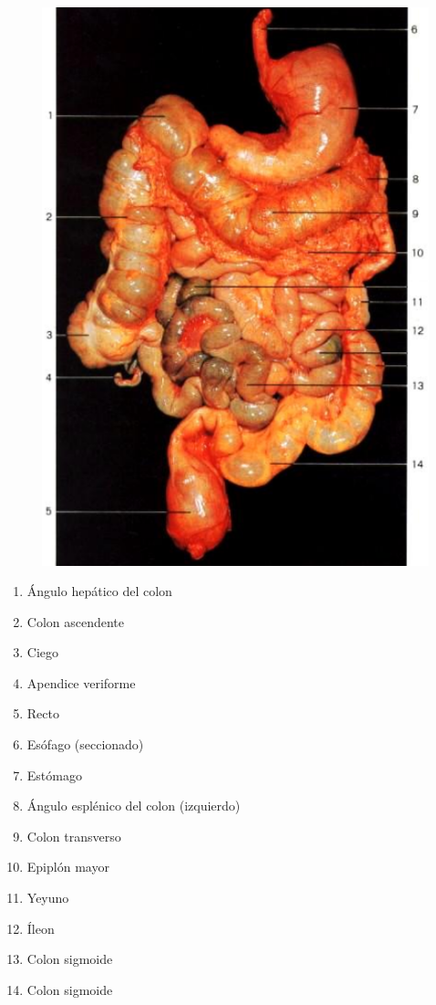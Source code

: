 \begin{figure}[H]
	\begin{center}
 		\includegraphics[width = 1\textwidth]{v2/images/image58.png}
	\end{center} 
\end{figure}
\begin{enumerate}
    \item Ángulo hepático del colon
    \item Colon ascendente
    \item Ciego
    \item Apendice veriforme
    \item Recto
    \item Esófago (seccionado)
    \item Estómago
    \item Ángulo esplénico del colon (izquierdo)
    \item Colon transverso
    \item Epiplón mayor
    \item Yeyuno
    \item Íleon
    \item Colon sigmoide
    \item Colon sigmoide    
\end{enumerate}
